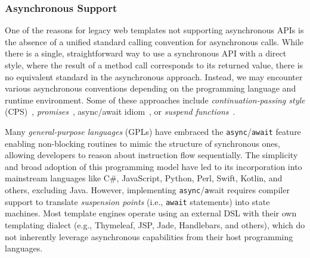\documentclass[software,article,accept,pdftex,moreauthors]{Definitions/mdpi}
\begin{document}

\subsubsection{Asynchronous Support}
\label{sec:async-support}

One of the reasons for legacy web templates not supporting asynchronous APIs is
the absence of a unified standard calling convention for asynchronous calls.
While there is a single, straightforward way to use a synchronous API with a
direct style, where the result of a method call corresponds to its returned
value, there is no equivalent standard in the asynchronous approach. Instead,
we may encounter various asynchronous conventions depending on the programming
language and runtime environment. Some of these approaches include
\emph{continuation-passing style} (CPS)~\cite{scheme},
\textit{promises}~\cite{promise}, async/await idiom~\cite{async_await},
or \textit{suspend functions}~\cite{elizarov2021coroutines}.

Many \textit{general-purpose languages} (GPLs) have embraced the
\texttt{async}/\texttt{await} feature~\cite{async_await} enabling non-blocking
routines to mimic the structure of synchronous ones, allowing developers to
reason about instruction flow sequentially. The simplicity and broad adoption
of this programming model have led to its incorporation into mainstream
languages like C\#, JavaScript, Python, Perl, Swift, Kotlin, and others,
excluding Java. However, implementing \texttt{async}/\texttt{a}wait requires
compiler support to translate \textit{suspension points} (i.e., \texttt{await}
statements) into state machines. Most template engines operate using an
external DSL with their own templating dialect (e.g., Thymeleaf, JSP, Jade,
Handlebars, and others), which do not inherently leverage asynchronous
capabilities from their host programming languages.
\end{document}
